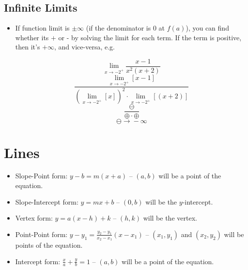 \documentclass[12pt]{article}
\def\Plus{\texttt{+}}
\def\Minus{\texttt{-}}
\begin{document}
\subsection{Infinite Limits}
\begin{itemize}
    \item If function limit is $\pm \infty$ (if the denominator is 0 at $f(a)$), you can find whether its $\Plus{}$ or $\Minus{}$ by solving the limit for each term. If the term is positive, then it's $+ \infty$, and vice-versa, e.g.
    
    $$\lim_{x \to -2^+} \frac{x-1}{x^2(x+2)}$$
    $$\frac{\lim_{x \to -2^+} [x-1]}{ (\lim_{x \to -2^+} [x])^2 \cdot \lim_{x \to -2^+} [(x+2)]}$$
    $$\frac{\ominus}{\oplus \cdot \oplus}$$
    $$\ominus \rightarrow{} -\infty$$

\end{itemize}

\section{Lines}
\begin{itemize}
    \item Slope-Point form: $y-b = m(x+a)$ -- $(a,b)$ will be a point of the equation.
    \item Slope-Intercept form: $y = mx + b$ -- $(0,b)$ will be the $y$-intercept.
    \item Vertex form: $y = a(x-h)+k$ -- $(h,k)$ will be the vertex.
    \item Point-Point form: $y-y_1=\frac{y_2-y_1}{x_2-x_1}(x-x_1)$ -- $(x_1,y_1)$ and $(x_2,y_2)$ will be points of the equation.
    \item Intercept form:  $\frac{x}{a} + \frac{y}{b} = 1$  -- $(a, b)$ will be a point of the equation.
    
\end{itemize}
\end{document}
